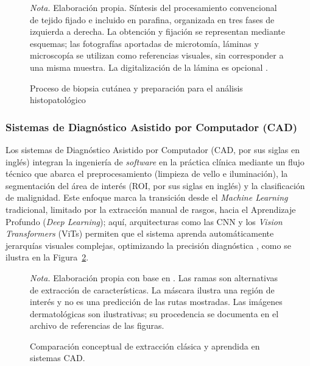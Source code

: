 \begin{figure}[!htbp]
\caption{Proceso de biopsia cutánea y preparación para el análisis histopatológico}
\label{fig:original-3}
\centering

\par\smallskip
\begingroup\footnotesize\singlespacing\raggedright
\textit{Nota.} Elaboración propia. Síntesis del procesamiento convencional de tejido fijado e incluido en parafina, organizada en tres fases de izquierda a derecha. La obtención y fijación se representan mediante esquemas; las fotografías aportadas de microtomía, láminas y microscopía se utilizan como referencias visuales, sin corresponder a una misma muestra. La digitalización de la lámina es opcional \parencite{sauter2023dermatopathologyreview}.
\par\endgroup
\end{figure}








\subsubsection{Sistemas de Diagnóstico Asistido por Computador (CAD)}

Los sistemas de Diagnóstico Asistido por Computador (CAD, por sus siglas en inglés) integran la ingeniería de \textit{software} en la práctica clínica mediante un flujo técnico que abarca el preprocesamiento (limpieza de vello e iluminación), la segmentación del área de interés (ROI, por sus siglas en inglés) y la clasificación de malignidad. Este enfoque marca la transición desde el \textit{Machine Learning} tradicional, limitado por la extracción manual de rasgos, hacia el Aprendizaje Profundo (\textit{Deep Learning}); aquí, arquitecturas como las CNN y los \textit{Vision Transformers} (ViTs) permiten que el sistema aprenda automáticamente jerarquías visuales complejas, optimizando la precisión diagnóstica \parencite{rehman2024cadskin}, como se ilustra en la Figura~\ref{fig:original-4}.

\begin{figure}[!htbp]
\caption{Comparación conceptual de extracción clásica y aprendida en sistemas CAD.}
\label{fig:original-4}
\centering

\par\smallskip
\begingroup\footnotesize\singlespacing\raggedright
\textit{Nota.} Elaboración propia con base en \parencite{rehman2024cadskin}. Las ramas son alternativas de extracción de características. La máscara ilustra una región de interés y no es una predicción de las rutas mostradas. Las imágenes dermatológicas son ilustrativas; su procedencia se documenta en el archivo de referencias de las figuras.
\par\endgroup
\end{figure}








